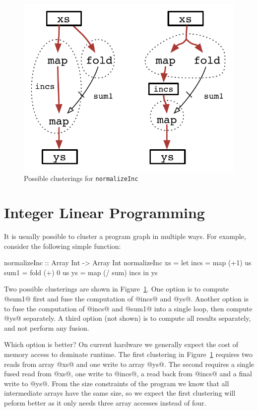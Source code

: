
\begin{figure}
\begin{center}
\includegraphics[scale=0.5]{figures/ex2-normalizeInc.pdf}
\end{center}
\caption{Possible clusterings for \texttt{normalizeInc}}
\label{f:normalizeInc}
\end{figure}


\section{Integer Linear Programming}
\label{s:ILP}
It is usually possible to cluster a program graph in multiple ways. For example, consider the following simple function:
\begin{code}
 normalizeInc :: Array Int -> Array Int
 normalizeInc xs
  = let incs = map  (+1)    us
        sum1 = fold (+) 0   us
        ys   = map  (/ sum) incs
    in  ys
\end{code}

Two possible clusterings are shown in Figure~\ref{f:normalizeInc}. One option is to compute @sum1@ first and fuse the computation of @incs@ and @ys@. Another option is to fuse the computation of @incs@ and @sum1@ into a single loop, then compute @ys@ separately. A third option (not shown) is to compute all results separately, and not perform any fusion. 

Which option is better? On current hardware we generally expect the cost of memory access to dominate runtime. The first clustering in Figure~\ref{f:normalizeInc} requires two reads from array @xs@ and one write to array @ys@. The second requires a single fused read from @xs@, one write to @incs@, a read back from @incs@ and a final write to @ys@. From the size constraints of the program we know that all intermediate arrays have the same size, so we expect the first clustering will peform better as it only needs three array accesses instead of four. 

